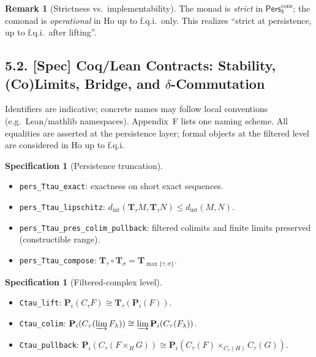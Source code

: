 \documentclass[11pt]{article}
\numberwithin{equation}{section}
\theoremstyle{plain}
\theoremstyle{definition}
\theoremstyle{remark}
\DeclareRobustCommand{\hyp}{\nobreakdash-}
\theoremstyle{plain}
\theoremstyle{definition}
\numberwithin{equation}{section}
\theoremstyle{definition}
\newtheorem{remark}[theorem]{Remark}
\newtheorem{specification}[theorem]{Specification}
\numberwithin{equation}{section}
\theoremstyle{plain}
\theoremstyle{definition}
\theoremstyle{remark}
\begin{document}
\begin{remark}[Strictness vs.\ implementability]
The monad is \emph{strict} in $\mathsf{Pers}^{\mathrm{cons}}_k$; the comonad is \emph{operational} in $\mathrm{Ho}$ up to f.q.i.\ only. This realizes “strict at persistence, up to f.q.i.\ after lifting”.
\end{remark}

\subsection*{5.2. \texorpdfstring{[Spec]}{[Spec]} Coq/Lean Contracts: Stability, (Co)Limits, Bridge, and $\delta$-Commutation}

\noindent Identifiers are indicative; concrete names may follow local conventions (e.g.\ Lean/mathlib namespaces). Appendix~F lists one naming scheme. All equalities are asserted at the persistence layer; formal objects at the filtered level are considered in $\mathrm{Ho}$ up to f.q.i.

\begin{specification}[Persistence truncation]\label{spec:pers-Ttau}
\begin{itemize}
  \item \texttt{pers\_Ttau\_exact}: exactness on short exact sequences.
  \item \texttt{pers\_Ttau\_lipschitz}: $d_{\mathrm{int}}(\mathbf{T}_\tau M,\mathbf{T}_\tau N)\le d_{\mathrm{int}}(M,N)$.
  \item \texttt{pers\_Ttau\_pres\_colim\_pullback}: filtered colimits and finite limits preserved (constructible range).
  \item \texttt{pers\_Ttau\_compose}: $\mathbf{T}_\tau\circ \mathbf{T}_\sigma=\mathbf{T}_{\max\{\tau,\sigma\}}$.
\end{itemize}
\end{specification}

\begin{specification}[Filtered\hyp complex level]\label{spec:filtered-level}
\begin{itemize}
  \item \texttt{Ctau\_lift}: $\mathbf{P}_i(C_\tau F)\cong \mathbf{T}_\tau(\mathbf{P}_i(F))$.
  \item \texttt{Ctau\_colim}: $\mathbf{P}_i(C_\tau(\varinjlim F_\lambda))\cong \varinjlim \mathbf{P}_i(C_\tau(F_\lambda))$.
  \item \texttt{Ctau\_pullback}: $\mathbf{P}_i(C_\tau(F\times_H G))\cong \mathbf{P}_i(C_\tau(F)\times_{C_\tau(H)}C_\tau(G))$.
\end{itemize}
\end{specification}
\end{document}

